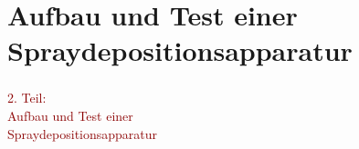 \documentclass{beamer}
\begin{document}
% 






\section{Aufbau und Test einer Spraydepositionsapparatur}



\begin{frame}
\frametitle{}
\begin{center}
\textcolor{darkred}{\huge{2. Teil:\\ \vspace{0.65cm}
 Aufbau und Test einer\\ \vspace{0.5cm}Spraydepositionsapparatur}}
\end{center}


\end{frame}
\end{document}
